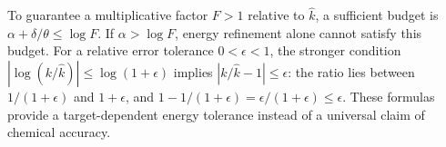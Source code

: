 To guarantee a multiplicative factor $F>1$ relative to $\widehat k$, a
sufficient budget is $\alpha+\delta/\theta\le\log F$.
If $\alpha>\log F$, energy refinement alone cannot satisfy this budget.
For a relative error tolerance $0<\epsilon<1$, the stronger condition
$|\log(k/\widehat k)|\le\log(1+\epsilon)$ implies
$|k/\widehat k-1|\le\epsilon$: the ratio lies between
$1/(1+\epsilon)$ and $1+\epsilon$, and
$1-1/(1+\epsilon)=\epsilon/(1+\epsilon)\le\epsilon$.
These formulas provide a target-dependent energy tolerance instead of a
universal claim of chemical accuracy.

